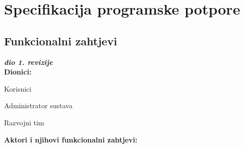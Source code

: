 \chapter{Specifikacija programske potpore}
		
	\section{Funkcionalni zahtjevi}
			
			\textbf{\textit{dio 1. revizije}}\\
			
			\noindent \textbf{Dionici:}
			
			\begin{packed_enum}
				
				\item Korisnici				
				\item Administrator sustava
				\item Razvojni tim 
				
			\end{packed_enum}
			
			\noindent \textbf{Aktori i njihovi funkcionalni zahtjevi:}
			
